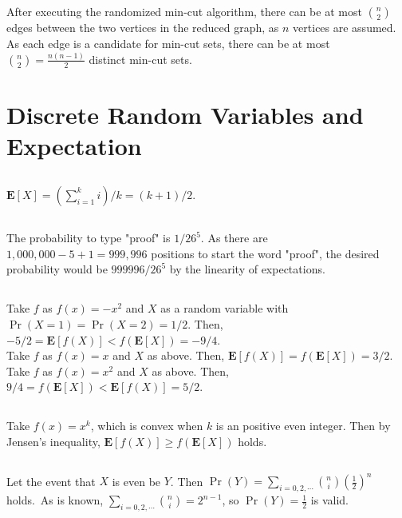 \documentclass{article}
\begin{document}
\subsection{}
After executing the randomized min-cut algorithm, there can be at most $\binom{n}{2}$ edges between the two vertices in the reduced graph, as $n$ vertices are assumed.
As each edge is a candidate for min-cut sets, there can be at most $\binom{n}{2}=\frac{n(n-1)}{2}$ distinct min-cut sets.
\subsection{}
\subsection{}
\newpage
\section{Discrete Random Variables and Expectation}
\subsection{}
$\textbf{E}[X]=\left(\sum\limits_{i=1}^ki\right)/k=(k+1)/2$.
\subsection{}
The probability to type "proof" is $1/26^5$. As there are $1,000,000-5+1=999,996$ positions to start the word "proof", the desired probability would be $999996/26^5$ by the linearity of expectations.
\subsection{}
Take $f$ as $f(x)=-x^2$ and $X$ as a random variable with $\Pr(X=1)=\Pr(X=2)=1/2$. Then, $-5/2=\textbf{E}[f(X)]<f(\textbf{E}[X])=-9/4$.\\
Take $f$ as $f(x)=x$ and $X$ as above. Then, $\textbf{E}[f(X)]=f(\textbf{E}[X])=3/2$.\\
Take $f$ as $f(x)=x^2$ and $X$ as above. Then, $9/4=f(\textbf{E}[X])<\textbf{E}[f(X)]=5/2$.
\subsection{}
Take $f(x)=x^k$, which is convex when $k$ is an positive even integer.
Then by Jensen's inequality, $\textbf{E}[f(X)] \geq f(\textbf{E}[X])$ holds.
\subsection{}
Let the event that $X$ is even be $Y$. Then $\Pr(Y)=\sum\limits_{i=0,2,\cdots}\binom{n}{i}(\frac{1}{2})^n$ holds.\
As is known, $\sum\limits_{i=0,2,\cdots}\binom{n}{i}=2^{n-1}$, so $\Pr(Y)={\frac{1}{2}}$ is valid.
\end{document}
